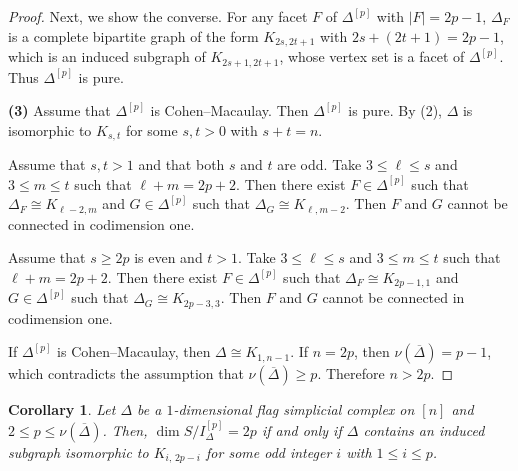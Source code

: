 \documentclass[12pt]{amsart}
\newtheorem{Corollary}[Theorem]{Corollary}
\begin{document}
\begin{proof}
Next, we show the converse.
For any facet $F$ of $\Delta^{[p]}$ with $|F| = 2p-1$,
$\Delta_F$ is a complete bipartite graph of the form $K_{2s,2t+1}$ with $2s + (2t+1) = 2p-1$, which is an induced subgraph of $K_{2s+1,2t+1}$,
whose vertex set is a facet of $\Delta^{[p]}$. Thus $\Delta^{[p]}$ is pure.

\textbf{(3)}
Assume that $\Delta^{[p]}$ is Cohen--Macaulay.
Then $\Delta^{[p]}$ is pure.
By (2), $\Delta$ is isomorphic to $K_{s,t}$ for some $s,t > 0$ with $s + t = n$.

Assume that $s,t > 1$ and that both $s$ and $t$ are odd.
Take $3 \le \ell \le s$ and $3 \le m \le t$ such that $\ell + m = 2p+2$.
Then there exist $F \in \Delta^{[p]}$ such that $\Delta_F \cong K_{\ell-2,m}$
and $G \in \Delta^{[p]}$ such that $\Delta_G \cong K_{\ell,m-2}$.
Then $F$ and $G$ cannot be connected in codimension one.

Assume that $s \ge 2p$ is even and $t > 1$.
Take $3 \le \ell \le s$ and $3 \le m \le t$ such that $\ell + m = 2p+2$.
Then there exist $F \in \Delta^{[p]}$ such that $\Delta_F \cong K_{2p-1,1}$
and $G \in \Delta^{[p]}$ such that $\Delta_G \cong K_{2p-3,3}$.
Then $F$ and $G$ cannot be connected in codimension one.

If $\Delta^{[p]}$ is Cohen--Macaulay, then $\Delta \cong K_{1,n-1}$.
If $n = 2p$, then $\nu(\overline{\Delta}) = p-1$, which contradicts the assumption that $\nu(\overline{\Delta}) \ge p$. Therefore $n > 2p$.
\end{proof}

\begin{Corollary}\label{coro: facet}
Let $\Delta$ be a $1$-dimensional flag simplicial complex on $[n]$ and $2\leq p\leq \nu(\overline{\Delta})$. Then, $\dim S/I_{\Delta}^{[p]}= 2p$ if and only if $\Delta$ contains an induced subgraph isomorphic to $K_{i,\,2p-i}$ for some odd integer $i$ with $1 \le i \le p$.
\end{Corollary}
\end{document}
